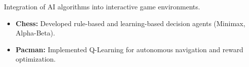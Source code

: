Integration of AI algorithms into interactive game environments.
\begin{itemize}
\item \textbf{Chess:} Developed rule-based and learning-based decision agents (Minimax, Alpha-Beta).
\item \textbf{Pacman:} Implemented Q-Learning for autonomous navigation and reward optimization.
\end{itemize}
{\LaTeXraggedright
{}
\par}
